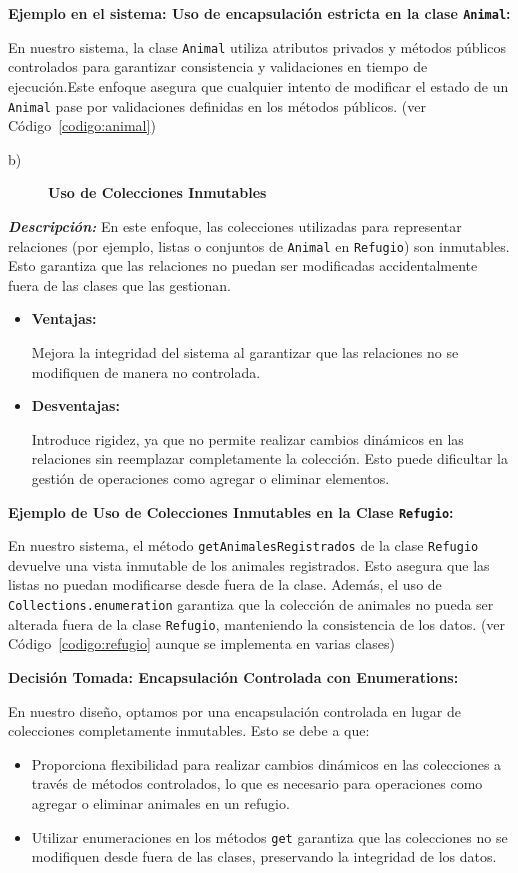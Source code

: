 \textbf{Ejemplo en el sistema: Uso de encapsulación estricta en la clase \texttt{Animal}:}\par  
En nuestro sistema, la clase \texttt{Animal} utiliza atributos privados y métodos públicos 
controlados para garantizar consistencia y validaciones en tiempo de ejecución.Este enfoque 
asegura que cualquier intento de modificar el estado de un \texttt{Animal} pase por 
validaciones definidas en los métodos públicos. (ver Código~\ref{codigo:animal})


\begin{description}
    \item[b)] \textbf{Uso de Colecciones Inmutables}
\end{description}

\textit{\textbf{Descripción:}}  
En este enfoque, las colecciones utilizadas para representar relaciones (por ejemplo, 
listas o conjuntos de \texttt{Animal} en \texttt{Refugio}) son inmutables. Esto garantiza 
que las relaciones no puedan ser modificadas accidentalmente fuera de las clases que las 
gestionan.

\begin{itemize}
    \item \textbf{Ventajas:}\par
    Mejora la integridad del sistema al garantizar que las relaciones no se modifiquen de 
    manera no controlada.
    \item \textbf{Desventajas:}\par
    Introduce rigidez, ya que no permite realizar cambios dinámicos en las relaciones sin 
    reemplazar completamente la colección. Esto puede dificultar la gestión de operaciones 
    como agregar o eliminar elementos.
\end{itemize}

\textbf{Ejemplo de Uso de Colecciones Inmutables en la Clase \texttt{Refugio}:}\par  
En nuestro sistema, el método \texttt{getAnimalesRegistrados} de la clase \texttt{Refugio} 
devuelve una vista inmutable de los animales registrados. Esto asegura que las listas no 
puedan modificarse desde fuera de la clase. Además, el uso de \texttt{Collections.}\texttt{enumeration} 
garantiza que la colección de animales no pueda ser alterada fuera de la clase \texttt{Refugio}, 
manteniendo la consistencia de los datos. (ver Código~\ref{codigo:refugio} aunque se implementa en varias clases)

\textbf{Decisión Tomada: Encapsulación Controlada con Enumerations:}\par
En nuestro diseño, optamos por una encapsulación controlada en lugar de colecciones 
completamente inmutables. Esto se debe a que:
\begin{itemize}
    \item Proporciona flexibilidad para realizar cambios dinámicos en las colecciones a 
    través de métodos controlados, lo que es necesario para operaciones como agregar o 
    eliminar animales en un refugio.
    \item Utilizar enumeraciones en los métodos \texttt{get} garantiza que las colecciones 
    no se modifiquen desde fuera de las clases, preservando la integridad de los datos.
\end{itemize}

